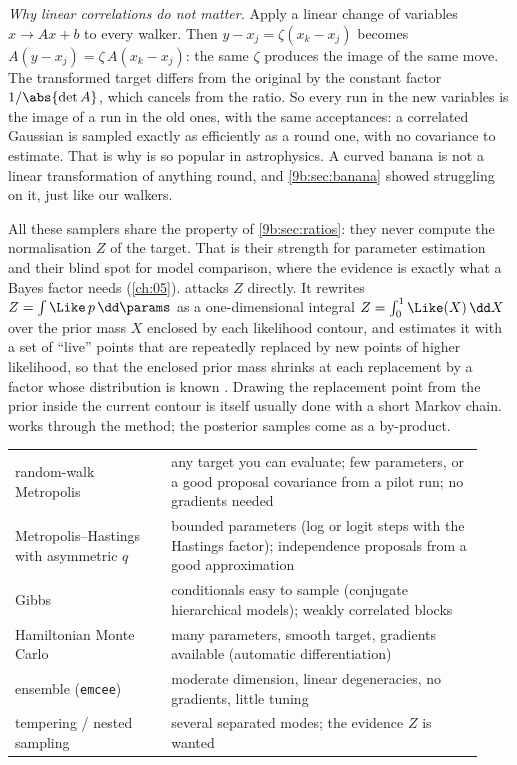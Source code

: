 \emph{Why linear correlations do not matter.} Apply a linear change of variables $x\to Ax+b$ to
every walker. Then $y-x_j=\zeta(x_k-x_j)$ becomes $A(y-x_j)=\zeta\,A(x_k-x_j)$: the same $\zeta$
produces the image of the same move. The transformed target differs from the original by the
constant factor $1/\abs{\det A}$, which cancels from the ratio. So every run in the new variables is
the image of a run in the old ones, with the same acceptances: a correlated Gaussian is sampled
exactly as efficiently as a round one, with no covariance to estimate. That is why  is so
popular in astrophysics. A curved banana is not a linear transformation of anything round, and
\cref{9b:sec:banana} showed  struggling on it, just like our walkers.

All these samplers share the property of \cref{9b:sec:ratios}: they never compute
the normalisation $Z$ of the target. That is their strength for parameter estimation and their
blind spot for model comparison, where the evidence is exactly what a Bayes factor needs
(\cref{ch:05}).  \parencite{Skilling2006} attacks $Z$ directly. It
rewrites $Z=\int\Like\,p\,\dd\params$ as a one-dimensional integral $Z=\int_0^1\Like(X)\,\dd X$
over the prior mass $X$ enclosed by each likelihood contour, and estimates it with a set of
``live'' points that are repeatedly replaced by new points of higher likelihood, so that the
enclosed prior mass shrinks at each replacement by a factor whose distribution is known
. Drawing the replacement point from the prior inside the
current contour is itself usually done with a short Markov chain.  works through the
method; the posterior samples come as a by-product.

\begin{taxonomy}
\small
\begin{tabular}{@{}p{0.31\linewidth}p{0.62\linewidth}@{}}
random-walk Metropolis & any target you can evaluate; few parameters, or a good proposal
  covariance from a pilot run; no gradients needed\\[2pt]
Metropolis--Hastings with asymmetric $q$ & bounded parameters (log or logit steps with the
  Hastings factor); independence proposals from a good approximation\\[2pt]
Gibbs & conditionals easy to sample (conjugate hierarchical models); weakly correlated
  blocks\\[2pt]
Hamiltonian Monte Carlo & many parameters, smooth target, gradients available (automatic
  differentiation)\\[2pt]
ensemble (\texttt{emcee}) & moderate dimension, linear degeneracies, no gradients, little
  tuning\\[2pt]
tempering / nested sampling & several separated modes; the evidence $Z$ is wanted
\end{tabular}
\end{taxonomy}

